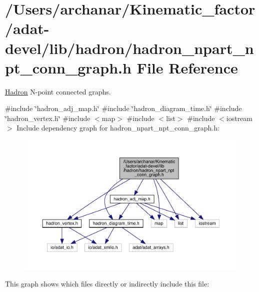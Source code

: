 \hypertarget{adat-devel_2lib_2hadron_2hadron__npart__npt__conn__graph_8h}{}\section{/\+Users/archanar/\+Kinematic\+\_\+factor/adat-\/devel/lib/hadron/hadron\+\_\+npart\+\_\+npt\+\_\+conn\+\_\+graph.h File Reference}
\label{adat-devel_2lib_2hadron_2hadron__npart__npt__conn__graph_8h}


\mbox{\hyperlink{namespaceHadron}{Hadron}} N-\/point connected graphs.  


{\ttfamily \#include \char`\"{}hadron\+\_\+adj\+\_\+map.\+h\char`\"{}}\newline
{\ttfamily \#include \char`\"{}hadron\+\_\+diagram\+\_\+time.\+h\char`\"{}}\newline
{\ttfamily \#include \char`\"{}hadron\+\_\+vertex.\+h\char`\"{}}\newline
{\ttfamily \#include $<$map$>$}\newline
{\ttfamily \#include $<$list$>$}\newline
{\ttfamily \#include $<$iostream$>$}\newline
Include dependency graph for hadron\+\_\+npart\+\_\+npt\+\_\+conn\+\_\+graph.\+h\+:
\nopagebreak
\begin{figure}[H]
\begin{center}
\leavevmode
\includegraphics[width=350pt]{d1/d5c/adat-devel_2lib_2hadron_2hadron__npart__npt__conn__graph_8h__incl}
\end{center}
\end{figure}
This graph shows which files directly or indirectly include this file\+:
